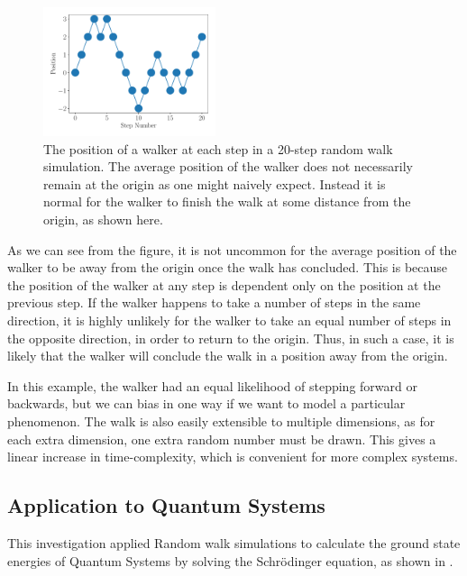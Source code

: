 \documentclass[journal]{IEEEtran}
\begin{document}
\begin{figure}[H]%
  \begin{center}
    \includegraphics[width=0.45\textwidth]{images/cartoon.pdf}
    \caption{The position of a walker at each step in a 20-step random walk
      simulation. The average position of the walker does not necessarily remain
      at the origin as one might naively expect. Instead it is normal for the
      walker to finish the walk at some distance from the origin, as shown here.}
    \label{fig:cartoon}
  \end{center}
\end{figure}

As we can see from the figure, it is not uncommon for the average position of
the walker to be away from the origin once the walk has concluded. This is
because the position of the walker at any step is dependent only on the position
at the previous step. If the walker happens to take a number of steps in the
same direction, it is highly unlikely for the walker to take an equal number of
steps in the opposite direction, in order to return to the origin. Thus, in such
a case, it is likely that the walker will conclude the walk in a position away
from the origin.

In this example, the walker had an equal likelihood of stepping forward or
backwards, but we can bias in one way if we want to model a particular
phenomenon. The walk is also easily extensible to multiple dimensions, as for
each extra dimension, one extra random number must be drawn. This gives a linear
increase in time-complexity, which is convenient for more complex systems.

\subsection{Application to Quantum Systems}

This investigation applied Random walk simulations to calculate the ground state
energies of Quantum Systems by solving the Schr\"{o}dinger equation, as shown in
\cite{Ceperley1983}.
\end{document}
